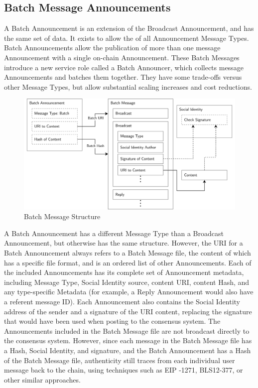 \documentclass[12pt,letterpaper]{article}
\begin{document}
\begin{appendices}


	\section{Batch Message Announcements}\label{app:batch_message_announcements}

	A Batch Announcement is an extension of the Broadcast Announcement, and has the same
        set of data. It exists to allow the  of all Announcement Message
        Types. Batch Announcements allow the publication of more than one message
        Announcement with a single on-chain Announcement.  These Batch Messages introduce a
        new service role called a Batch Announcer, which collects message Announcements and
        batches them together. They have some trade-offs versus other Message Types, but
        allow substantial scaling increases and cost reductions.

	\begin{figure}[h]
		\includegraphics[width=\linewidth]{figures/Batch Message Structure.png}
		\caption{Batch Message Structure}
		\label{fig:9}
	\end{figure}

	A Batch Announcement has a different Message Type than a Broadcast Announcement, but
        otherwise has the same structure. However, the URI for a Batch Announcement always
        refers to a Batch Message file, the content of which has a specific file format, and
        is an ordered list of other Announcements. Each of the included Announcements has
        its complete set of Announcement metadata, including Message Type, Social Identity
        source, content URI, content Hash, and any type-specific Metadata (for example, a
        Reply Announcement would also have a referent message ID).  Each Announcement also
        contains the Social Identity address of the sender and a signature of the URI
        content, replacing the signature that would have been used when posting to the
        consensus system. The Announcements included in the Batch Message file are not
        broadcast directly to the consensus system. However, since each message in the Batch
        Message file has a Hash, Social Identity, and signature, and the Batch Announcement
        has a Hash of the Batch Message file, authenticity still traces from each individual
        user message back to the chain, using techniques such as EIP -1271,\cite{eip1271}
        BLS12-377,\cite{el2020} or other similar approaches.


\end{appendices}
\end{document}
